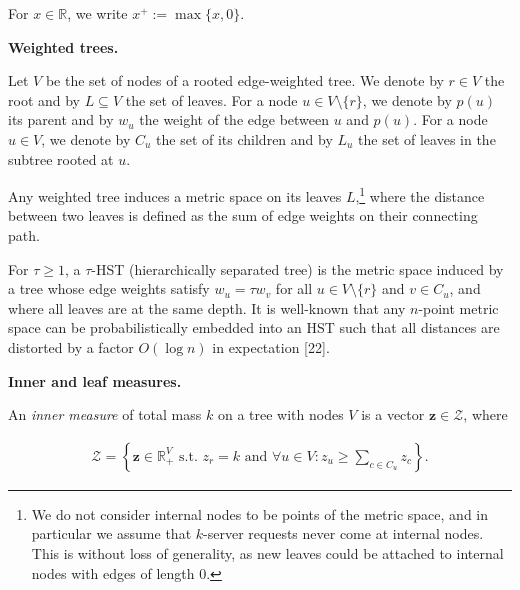 For $x\in\mathbb{R}$, we write $x^{+}:=\max\{x,0\}$.\par




\par\medskip\noindent\textbf{Weighted trees.}\par




Let $V$ be the set of nodes of a rooted edge-weighted tree. We denote by $r\in V$ the root and by $L\subseteq V$ the set of leaves. For a node $u\in V\setminus\{r\}$, we denote by $p(u)$ its parent and by $w_{u}$ the weight of the edge between $u$ and $p(u)$.
For a node $u\in V$, we denote by $C_{u}$ the set of its children and by $L_{u}$ the set of leaves in the subtree rooted at $u$.\par




Any weighted tree induces a metric space on its leaves $L$,\footnote{We do not consider internal nodes to be points of the metric space, and in particular we assume that $k$-server requests never come at internal nodes. This is without loss of generality, as new leaves could be attached to internal nodes with edges of length $0$.} where the distance between two leaves is defined as the sum of edge weights on their connecting path.\par




For $\tau\geq 1$, a $\tau$-HST (hierarchically separated tree) is the metric space induced by a tree whose edge weights satisfy $w_{u}=\tau w_{v}$ for all $u\in V\setminus\{r\}$ and $v\in C_{u}$, and where all leaves are at the same depth. It is well-known that any $n$-point metric space can be probabilistically embedded into an HST such that all distances are distorted by a factor $O(\log n)$ in expectation [22].\par





\par\medskip\noindent\textbf{Inner and leaf measures.}\par




An \emph{inner measure} of total mass $k$ on a tree with nodes $V$ is a vector ${\mathbf{z}}\in\mathcal{Z}$, where\par


\[\begin{gathered}
\mathcal{Z}=\left\{{\mathbf{z}}\in\mathbb{R}_{+}^{V}\text{ s.t. }z_{r}=k\text{ and }\forall u\in V\colon z_{u}\geq\sum_{c\in C_{u}}z_{c}\right\}.
\end{gathered}\]


